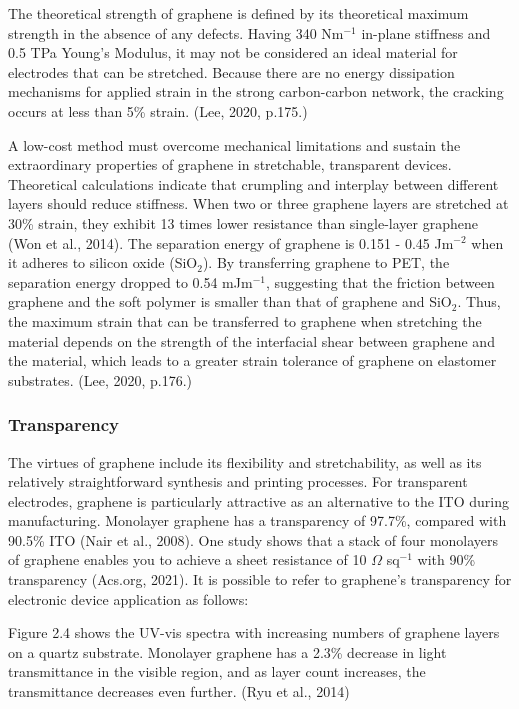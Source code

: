 \documentclass[a4paper,12pt]{article}
\numberwithin{equation}{section}
\numberwithin{figure}{section}
\begin{document}
\noindent The theoretical strength of graphene is defined by its theoretical maximum strength in the absence of any defects. Having 340 Nm$^{-1}$ in-plane stiffness and 0.5 TPa Young’s Modulus, it may not be considered an ideal material for electrodes that can be stretched. Because there are no energy dissipation mechanisms for applied strain in the strong carbon-carbon network, the cracking occurs at less than 5\% strain. (Lee, 2020, p.175.)\vspace{\baselineskip}

A low-cost method must overcome mechanical limitations and sustain the extraordinary properties of graphene in stretchable, transparent devices. Theoretical calculations indicate that crumpling and interplay between different layers should reduce stiffness. When two or three graphene layers are stretched at 30\% strain, they exhibit 13 times lower resistance than single-layer graphene (Won et al., 2014). The separation energy of graphene is 0.151 - 0.45 Jm$^{-2}$ when it adheres to silicon oxide (SiO$_{2}$). By transferring graphene to PET, the separation energy dropped to 0.54 mJm$^{-1}$, suggesting that the friction between graphene and the soft polymer is smaller than that of graphene and SiO$_{2}$. Thus, the maximum strain that can be transferred to graphene when stretching the material depends on the strength of the interfacial shear between graphene and the material, which leads to a greater strain tolerance of graphene on elastomer substrates. (Lee, 2020, p.176.)

\subsubsection{Transparency}

\noindent The virtues of graphene include its flexibility and stretchability, as well as its relatively straightforward synthesis and printing processes. For transparent electrodes, graphene is particularly attractive as an alternative to the ITO during manufacturing. Monolayer graphene has a transparency of 97.7\%, compared with 90.5\% ITO (Nair et al., 2008). One study shows that a stack of four monolayers of graphene enables you to achieve a sheet resistance of 10 $\Omega$ sq$^{-1}$ with 90\% transparency (Acs.org, 2021). It is possible to refer to graphene's transparency for electronic device application as follows:\vspace{\baselineskip}

\noindent Figure 2.4 shows the UV-vis spectra with increasing numbers of graphene layers on a quartz substrate. Monolayer graphene has a 2.3\% decrease in light transmittance in the visible region, and as layer count increases, the transmittance decreases even further. (Ryu et al., 2014)\vspace{\baselineskip}
\end{document}
